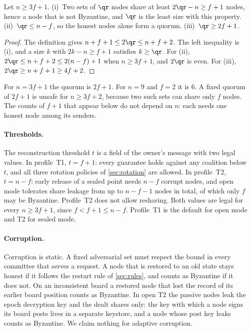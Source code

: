 \begin{lemma}[Quorum]\label{lem:quorum}
Let $n \ge 3f+1$. \textup{(i)}~Two sets of $\qr$ nodes share at least $2\qr - n \ge f+1$ nodes, hence a node that is not Byzantine, and $\qr$ is the least size with this property. \textup{(ii)}~$\qr \le n-f$, so the honest nodes alone form a quorum. \textup{(iii)}~$\qr \ge 2f+1$.
\end{lemma}

\begin{proof}
The definition gives $n+f+1 \le 2\qr \le n+f+2$. The left inequality is (i), and a size $k$ with $2k - n \ge f+1$ satisfies $k \ge \qr$. For (ii), $2\qr \le n+f+2 \le 2(n-f)+1$ when $n \ge 3f+1$, and $2\qr$ is even. For (iii), $2\qr \ge n+f+1 \ge 4f+2$.
\end{proof}

For $n = 3f+1$ the quorum is $2f+1$. For $n = 9$ and $f = 2$ it is $6$. A fixed quorum of $2f+1$ is unsafe for $n \ge 3f+2$, because two such sets can share only $f$ nodes. The counts of $f+1$ that appear below do not depend on $n$: each needs one honest node among its senders.

\paragraph{Thresholds.} The reconstruction threshold $t$ is a field of the owner's message with two legal values. In profile~T1, $t = f+1$: every guarantee holds against any coalition below $t$, and all three rotation policies of \cref{sec:rotation} are allowed. In profile~T2, $t = n-f$: early release of a sealed point needs $n-f$ corrupt nodes, and open mode tolerates share leakage from up to $n-f-1$ nodes in total, of which only $f$ may be Byzantine. Profile~T2 does not allow resharing. Both values are legal for every $n \ge 3f+1$, since $f < f+1 \le n-f$. Profile~T1 is the default for open mode and T2 for sealed mode.

\paragraph{Corruption.} Corruption is static. A fixed adversarial set must respect the bound in every committee that serves a request. A node that is restored to an old state stays honest if it follows the restart rule of \cref{sec:rules}, and counts as Byzantine if it does not. On an inconsistent board a restored node that lost the record of its earlier board position counts as Byzantine. In open T2 the passive nodes leak the epoch decryption key and the dealt shares only: the key with which a node signs its board posts lives in a separate keystore, and a node whose post key leaks counts as Byzantine. We claim nothing for adaptive corruption.

